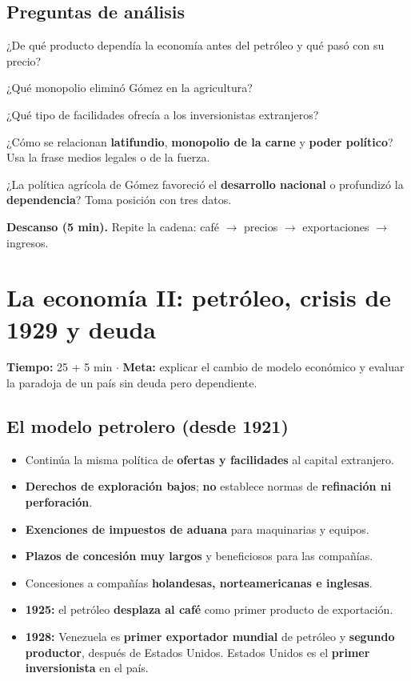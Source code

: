 \documentclass[12pt, letterpaper]{article}
\makeatletter
\let\mw@oldsection\section
\newcommand{\mw@prepage}{%
  \par
  \ifdim\pagegoal=\maxdimen\else
    \ifdim\dimexpr\pagegoal-\pagetotal\relax<7cm\relax
      \newpage
    \fi
  \fi}
\renewcommand{\section}{\mw@prepage\mw@oldsection}
\newcommand{\metasesion}[2]{%
  \begin{cabecerasesion}
    \small
    \textbf{\color{mwprimario}Tiempo:} #1 \quad$\cdot$\quad
    \textbf{\color{mwprimario}Meta:} #2
  \end{cabecerasesion}%
}
\newcommand{\pausa}[1]{%
  \begin{descanso}
    \small\textbf{\color{mwnaranja}Descanso (5 min).} #1
  \end{descanso}%
}
\makeatother
\begin{document}
\subsection*{Preguntas de análisis}
\begin{preguntas}
  \item \facil{} ¿De qué producto dependía la economía antes del petróleo y qué
        pasó con su precio?
  \item \facil{} ¿Qué monopolio eliminó Gómez en la agricultura?
  \item \medio{} ¿Qué tipo de facilidades ofrecía a los inversionistas
        extranjeros?
  \item \dificil{} ¿Cómo se relacionan \textbf{latifundio}, \textbf{monopolio de
        la carne} y \textbf{poder político}? Usa la frase
        \guillemotleft medios legales o de la fuerza\guillemotright.
  \item \muyDificil{} ¿La política agrícola de Gómez favoreció el
        \textbf{desarrollo nacional} o profundizó la \textbf{dependencia}? Toma
        posición con tres datos.
\end{preguntas}

\pausa{Repite la cadena: café $\rightarrow$ precios $\rightarrow$ exportaciones
$\rightarrow$ ingresos.}

\section{La economía II: petróleo, crisis de 1929 y deuda}

\metasesion{25 + 5 min}{explicar el cambio de modelo económico y evaluar la
paradoja de un país sin deuda pero dependiente.}

\subsection*{El modelo petrolero (desde 1921)}
\begin{itemize}[leftmargin=*, itemsep=3pt]
  \item Continúa la misma política de \textbf{ofertas y facilidades} al capital
        extranjero.
  \item \textbf{Derechos de exploración bajos}; \textbf{no} establece normas de
        \textbf{refinación ni perforación}.
  \item \textbf{Exenciones de impuestos de aduana} para maquinarias y equipos.
  \item \textbf{Plazos de concesión muy largos} y beneficiosos para las
        compañías.
  \item Concesiones a compañías \textbf{holandesas, norteamericanas e inglesas}.
  \item \textbf{1925:} el petróleo \textbf{desplaza al café} como primer producto
        de exportación.
  \item \textbf{1928:} Venezuela es \textbf{primer exportador mundial} de
        petróleo y \textbf{segundo productor}, después de Estados Unidos. Estados
        Unidos es el \textbf{primer inversionista} en el país.
\end{itemize}
\end{document}
